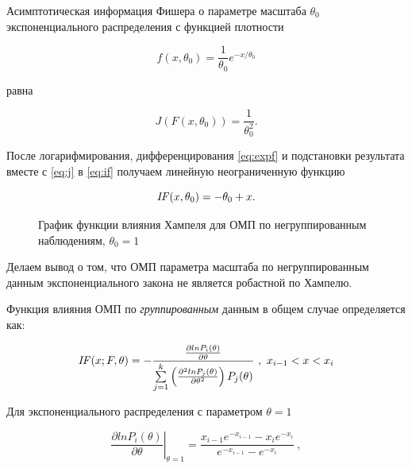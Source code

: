 \documentclass[a4paper,12pt]{article}
\begin{document}
\begin{enumerate}
Асимптотическая информация Фишера о параметре масштаба $\theta_0$
экспоненциального распределения с функцией плотности

\begin{equation} \label{eq:expf}
f(x, \theta_0) = \frac{1}{\theta_0} e^{-x / \theta_0 } 
\end{equation}

равна

\begin{equation} \label{eq:j}
	J(F(x, \theta_0)) = \frac{1}{\theta^2_0}.
\end{equation}

После логарифмирования, дифференцирования \eqref{eq:expf} и подстановки
результата вместе с \eqref{eq:j} в \eqref{eq:if} получаем линейную
неограниченную функцию

\[ \mbox{\emph{IF}}(x, \theta_0) = -\theta_0 + x .\]

\begin{figure}[h]
\centering
{}
\captionsetup{justification=centering}
\caption{График функции влияния Хампеля для ОМП по негруппированным 
	наблюдениям, $\theta_0 = 1$}
\end{figure}

Делаем вывод о том, что ОМП параметра масштаба по негруппированным данным
экспоненциального закона не является робастной по Хампелю.

\newpage

Функция влияния ОМП по \emph{группированным} данным в общем случае определяется
как:

\begin{equation}
	\mbox{\emph{IF}}(x; F, \theta) =
		-\frac
			{
				\frac
					{\partial lnP_i(\theta)}
					{\partial \theta}
			}
			{
				\sum\limits_{j=1}^{k}
				\left( \frac{\partial^2 lnP_j(\theta)}{\partial \theta^2} \right)
				P_j(\theta)
			}
			\ , \ x_{i-1} < x < x_i
\end{equation}

Для экспоненциального распределения с параметром $\theta = 1$

\begin{equation}
	\left.\frac {\partial lnP_i(\theta)} {\partial \theta} \right\rvert_{\theta=1} =
	\frac
	{ x_{i-1} e^{-x_{i-1}} - x_i e^{-x_i} }
	{ e^{-x_{i-1}} - e^{-x_i} } \ ,
\end{equation}


\end{enumerate}
\end{document}
